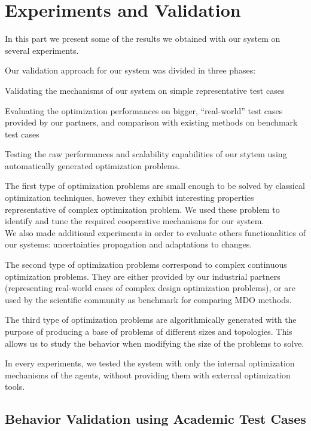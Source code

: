 \part{Experiments and Validation}

In this part we present some of the results we obtained with our system on several experiments.

Our validation approach for our system was divided in three phases:
\begin{compactitem}
\item Validating the mechanisms of our system on simple representative test cases
\item Evaluating the optimization performances on bigger, \enquote{real-world} test cases provided by our partners, and comparison with existing methods on benchmark test cases
\item Testing the raw performances and scalability capabilities of our stytem using automatically generated optimization problems.
\end{compactitem}

The first type of optimization problems are small enough to be solved by classical optimization techniques, however they exhibit interesting properties representative of complex optimization problem. We used these problem to identify and tune the required cooperative mechanisms for our system.\\
We also made additional experiments in order to evaluate others functionalities of our systems: uncertainties propagation and adaptations to changes.

The second type of optimization problems correspond to complex continuous optimization problems. They are either provided by our industrial partners (representing real-world cases of complex design optimization problems), or are used by the scientific community as benchmark for comparing MDO methods.

The third type of optimization problems are algorithmically generated with the purpose of producing a base of problems of different sizes and topologies. This allows us to study the behavior when modifying the size of the problems to solve.

In every experiments, we tested the system with only the internal optimization mechanisms of the agents, without providing them with external optimization tools.

\chapter{Behavior Validation using Academic Test Cases}

